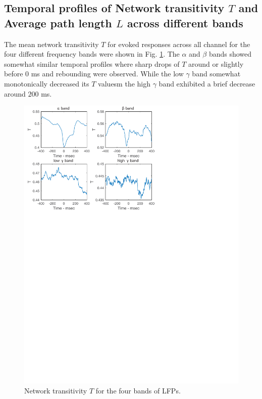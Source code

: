\documentclass[letterpaper, 9pt, conference]{ieeeconf}
\begin{document}
\subsection{Temporal profiles of  Network transitivity $T$  and Average path length $L$ across different bands}
The mean network transitivity $T$  for evoked responses across all channel for the four different frequency bands were shown in Fig. \ref{fig:GC_low}. The $\alpha$ and $\beta$ bands showed somewhat similar temporal profiles where sharp drops of $T$ around or slightly before $0$ ms and rebounding were observed. While the low $\gamma$ band somewhat monotonically decreased its $T$ valuesm the high $\gamma$ band exhibited a brief decrease around $200$ ms. 

\begin{figure}[ht!]
\begin{center}
                             \includegraphics[scale=0.6]{T_Multiple_Bands.pdf}
                             \end{center}
                                                          \vspace{-4.2in}
                             \caption{\label{fig:GC_low} Network transitivity $T$ for the four bands of LFPs.}
\end{figure}
\end{document}
